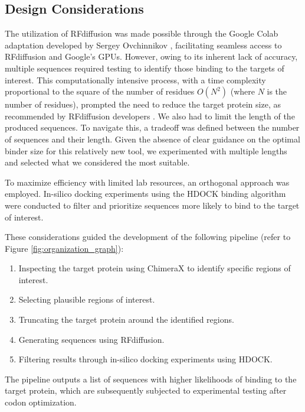 \documentclass[11pt,a4paper]{article}
\begin{document}
\subsection{Design Considerations}

The utilization of RFdiffusion was made possible through the Google Colab adaptation developed by Sergey Ovchinnikov \cite{ovchinnikov2023colab}, facilitating seamless access to RFdiffusion and Google's GPUs. However, owing to its inherent lack of accuracy, multiple sequences required testing to identify those binding to the targets of interest. This computationally intensive process, with a time complexity proportional to the square of the number of residues $O(N^2)$ (where $N$ is the number of residues), prompted the need to reduce the target protein size, as recommended by RFdiffusion developers \cite{rfdiffusion_github}. We also had to limit the length of the produced sequences. To navigate this, a tradeoff was defined between the number of sequences and their length. Given the absence of clear guidance on the optimal binder size for this relatively new tool, we experimented with multiple lengths and selected what we considered the most suitable.

To maximize efficiency with limited lab resources, an 
orthogonal approach was employed. In-silico docking experiments using 
the HDOCK binding algorithm were conducted to filter and prioritize 
sequences more likely to bind to the target of interest.

These considerations guided the development of the following pipeline 
(refer to Figure \ref{fig:organization_graph}):

\begin{enumerate}
    \item Inspecting the target protein using ChimeraX to identify 
    specific regions of interest.
    \item Selecting plausible regions of interest.
    \item Truncating the target protein around the identified regions.
    \item Generating sequences using RFdiffusion.
    \item Filtering results through in-silico docking experiments using 
    HDOCK.
\end{enumerate}

The pipeline outputs a list of sequences with higher likelihoods of binding to the target protein, which are subsequently subjected to experimental testing after codon optimization.
\end{document}
